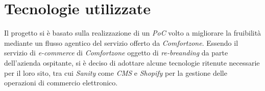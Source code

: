
\section{Tecnologie utilizzate}

Il progetto si è basato sulla realizzazione di un \emph{PoC} volto a migliorare la fruibilità mediante un flusso agentico del servizio offerto da \emph{Comfortzone}. 
Essendo il servizio di \emph{e-commerce} di \emph{Comfortzone} oggetto di \emph{re-breanding} da parte dell'azienda ospitante, si è deciso di adottare alcune tecnologie 
ritenute necessarie per il loro sito, tra cui \emph{Sanity} come \emph{CMS} e \emph{Shopify} per la gestione delle operazioni di commercio elettronico.



